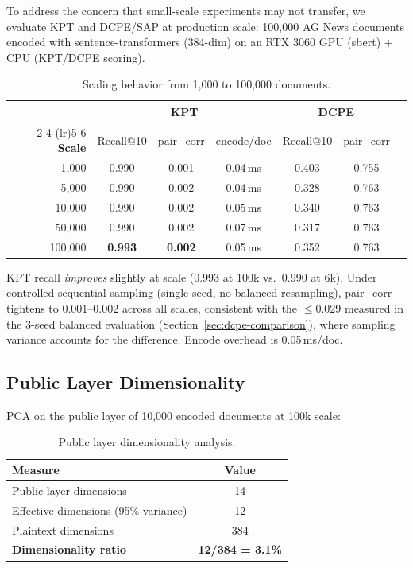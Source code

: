 \documentclass{article}
\begin{document}
To address the concern that small-scale experiments may not transfer, we evaluate KPT and DCPE/SAP at production scale: 100{,}000 AG News documents encoded with sentence-transformers (384-dim) on an RTX 3060 GPU (sbert) + CPU (KPT/DCPE scoring).

\begin{table}[htbp]
\centering
\caption{Scaling behavior from 1{,}000 to 100{,}000 documents.}
\label{tab:scaling}
\begin{tabular}{@{}rcccccc@{}}
\toprule
 & \multicolumn{3}{c}{\textbf{KPT}} & \multicolumn{2}{c}{\textbf{DCPE}} \\
\cmidrule(lr){2-4} \cmidrule(lr){5-6}
\textbf{Scale} & Recall@10 & pair\_corr & encode/doc & Recall@10 & pair\_corr \\
\midrule
1{,}000 & 0.990 & 0.001 & 0.04\,ms & 0.403 & 0.755 \\
5{,}000 & 0.990 & 0.002 & 0.04\,ms & 0.328 & 0.763 \\
10{,}000 & 0.990 & 0.002 & 0.05\,ms & 0.340 & 0.763 \\
50{,}000 & 0.990 & 0.002 & 0.07\,ms & 0.317 & 0.763 \\
100{,}000 & \textbf{0.993} & \textbf{0.002} & 0.05\,ms & 0.352 & 0.763 \\
\bottomrule
\end{tabular}
\end{table}

KPT recall \emph{improves} slightly at scale (0.993 at 100k vs.\ 0.990 at 6k).
Under controlled sequential sampling (single seed, no balanced resampling), pair\_corr tightens to 0.001--0.002 across all scales, consistent with the $\leq 0.029$ measured in the 3-seed balanced evaluation (Section~\ref{sec:dcpe-comparison}), where sampling variance accounts for the difference.
Encode overhead is 0.05\,ms/doc.

\subsection{Public Layer Dimensionality}

\begin{observation}
\label{obs:pca}
PCA on the public layer of 10{,}000 encoded documents at 100k scale:
\end{observation}

\begin{table}[htbp]
\centering
\caption{Public layer dimensionality analysis.}
\label{tab:pca}
\begin{tabular}{@{}lc@{}}
\toprule
\textbf{Measure} & \textbf{Value} \\
\midrule
Public layer dimensions & 14 \\
Effective dimensions (95\% variance) & 12 \\
Plaintext dimensions & 384 \\
\textbf{Dimensionality ratio} & \textbf{12/384 = 3.1\%} \\
\bottomrule
\end{tabular}
\end{table}
\end{document}
